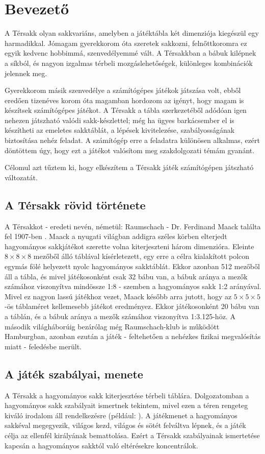 \documentclass[12pt, twoside]{report}
\begin{document}
\tableofcontents

\chapter{Bevezető}

A Térsakk olyan sakkvariáns, amelyben a játéktábla két dimenziója kiegészül egy harmadikkal. Jómagam gyerekkorom óta szeretek sakkozni, felnőttkoromra ez egyik kedvenc hobbimmá, szenvedélyemmé vált. A Térsakkban a bábuk kilépnek a síkból, és nagyon izgalmas térbeli mozgáslehetőségek, különleges kombinációk jelennek meg. 

Gyerekkorom másik szenvedélye a számítógépes játékok játszása volt, ebből eredően tizenéves korom óta magamban hordozom az igényt, hogy magam is készítsek szá\-mí\-tó\-gé\-pes játékot. A Térsakk a tábla szerkezetéből adódóan igen nehezen játszható valódi sakk-készlettel; még ha ügyes barkácsember el is készítheti az emeletes sakktáblát, a lépések kivitelezése, szabályosságának biztosítása nehéz feladat. A számítógép erre a feladatra különösen alkalmas, ezért döntöttem úgy, hogy ezt a játékot valósítom meg szakdolgozati témám gyanánt.

Célomul azt tűztem ki, hogy elkészítem a Térsakk játék számítógépen játszható változatát. 

\section{A Térsakk rövid története}
A Térsakkot - eredeti nevén, németül: Raumschach - Dr. Ferdinand Maack találta fel 1907-ben  \cite{chessvariants}. Maack a nyugati világban addigra széles körben elterjedt hagyományos sakkjátékot szerette volna kiterjeszteni három dimenzióra. Eleinte $ 8 \times 8 \times 8 $ mezőből álló táblával kísérletezett, egy erre a célra kialakított polcon egymás fölé helyezett nyolc hagyományos sakktáblát. Ekkor azonban 512 mezőből áll a tábla, és mivel játékosonként csak 32 bábu van, a bábuk aránya a mezők számához viszonyítva mindössze 1:8 - szemben a hagyományos sakk 1:2 arányával. Mivel ez nagyon lassú játékhoz vezet, Maack később arra jutott, hogy az $ 5 \times 5 \times 5 $-ös táblaméret kellemesebb játékot eredményez. Ekkor játékosonként 20 bábu van a táblán, és a bábuk aránya a mezők számához viszonyítva 1:3.125-höz. A második világháborúig bezárólag még Raumschach-klub is működött Hamburgban, azonban ezután a játék - feltehetően a nehézkes fizikai megvalósítás miatt - feledésbe merült.

\section{A játék szabályai, menete}
A Térsakk a hagyományos sakk kiterjesztése térbeli táblára. Dolgozatomban a hagyományos sakk szabályait ismertnek tekintem, mivel ezen a téren rengeteg kiváló irodalom áll rendelkezésre (például: \cite{zold}). A játékmenet a hagyományos sakkéval megegyezik, világos kezd, világos és sötét felváltva lépnek, és a játék célja az ellenfél királyának bemattolása. Ezért a Térsakk szabályainak ismertetése kapcsán a hagyományos sakktól való eltérésekre koncentrálok.
\end{document}
